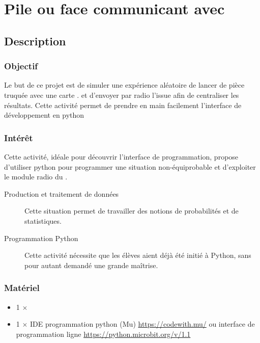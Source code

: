 \section{Pile ou face communicant avec \mbpy}


\pagestyle{mbpy}

\subsection{Description}

\subsubsection{Objectif}

\begin{formule}
Le but de ce projet est de simuler une expérience aléatoire de lancer de pièce truquée avec une carte \mb. et d'envoyer par radio l'issue afin de centraliser les résultats.
Cette activité permet de prendre en main facilement l'interface de développement en python
\end{formule}

\subsubsection{Intérêt}
Cette activité, idéale pour découvrir l'interface de programmation, propose d'utiliser python pour programmer une situation non-équiprobable et d'exploiter le module radio du \mb. 
\begin{description}
    \item [Production et traitement de données] Cette situation permet de travailler des notions de probabilités et de statistiques.
    \item [Programmation Python] Cette activité nécessite que les élèves aient déjà été initié à Python, sans pour autant demandé une grande maîtrise.
    
\end{description}


\subsubsection{Matériel}
\begin{itemize}
    \item 1 $\times$ \matosMb
    \item 1 $\times$ IDE programmation python (Mu) \url{https://codewith.mu/} ou interface de programmation ligne \url{https://python.microbit.org/v/1.1}
\end{itemize}

